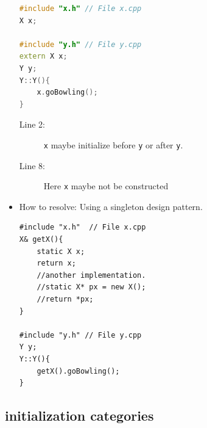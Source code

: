 \documentclass[a4paper,11pt,twoside]{book}
\begin{document}
\begin{itemize}
\begin{lstlisting}[frame=single, language=c++]
#include "x.h" // File x.cpp
X x;
	
#include "y.h" // File y.cpp
extern X x;
Y y;
Y::Y(){ 
	x.goBowling();
}
\end{lstlisting}
\begin{description}
	\item[Line 2:] \texttt{x} maybe initialize before \texttt{y} or after \texttt{y}.
	\item[Line 8:] Here \texttt{x} maybe not be constructed
\end{description}
	
	\item  How to resolve: Using a singleton design pattern.
	\begin{lstlisting}[numbers=none]
#include "x.h"  // File x.cpp
X& getX(){
	static X x;
	return x;
	//another implementation.
	//static X* px = new X();
	//return *px;
}
	
#include "y.h" // File y.cpp
Y y;
Y::Y(){
	getX().goBowling();
}
\end{lstlisting}
\end{itemize}


\subsection{initialization  categories}
\end{document}
